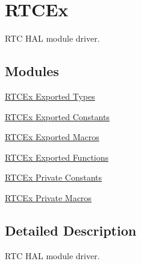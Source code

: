 \hypertarget{group___r_t_c_ex}{}\section{R\+T\+C\+Ex}
\label{group___r_t_c_ex}


R\+TC H\+AL module driver.  


\subsection*{Modules}
\begin{DoxyCompactItemize}
\item 
\hyperlink{group___r_t_c_ex___exported___types}{R\+T\+C\+Ex Exported Types}
\item 
\hyperlink{group___r_t_c_ex___exported___constants}{R\+T\+C\+Ex Exported Constants}
\item 
\hyperlink{group___r_t_c_ex___exported___macros}{R\+T\+C\+Ex Exported Macros}
\item 
\hyperlink{group___r_t_c_ex___exported___functions}{R\+T\+C\+Ex Exported Functions}
\item 
\hyperlink{group___r_t_c_ex___private___constants}{R\+T\+C\+Ex Private Constants}
\item 
\hyperlink{group___r_t_c_ex___private___macros}{R\+T\+C\+Ex Private Macros}
\end{DoxyCompactItemize}


\subsection{Detailed Description}
R\+TC H\+AL module driver. 

